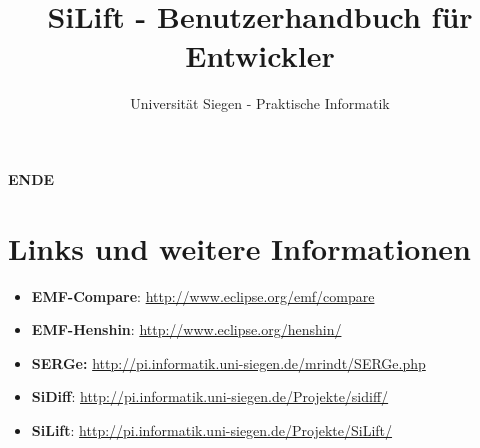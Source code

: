 \documentclass[a4paper]{scrartcl}
\begin{document}
\title{SiLift - Benutzerhandbuch für Entwickler}
\author{Universität Siegen - Praktische Informatik}


\maketitle



\newpage

\tableofcontents
\newpage
















\begin{center}
\textbf{ENDE}
\end{center}

\newpage

\section{Links und weitere Informationen}

\begin{itemize}
\item \textbf{EMF-Compare}: \url{http://www.eclipse.org/emf/compare}
\item \textbf{EMF-Henshin}: \url{http://www.eclipse.org/henshin/}
\item \textbf{SERGe:} \url{http://pi.informatik.uni-siegen.de/mrindt/SERGe.php}
\item \textbf{SiDiff}: \url{http://pi.informatik.uni-siegen.de/Projekte/sidiff/}
\item \textbf{SiLift}: \url{http://pi.informatik.uni-siegen.de/Projekte/SiLift/}
\end{itemize} 
\end{document}
